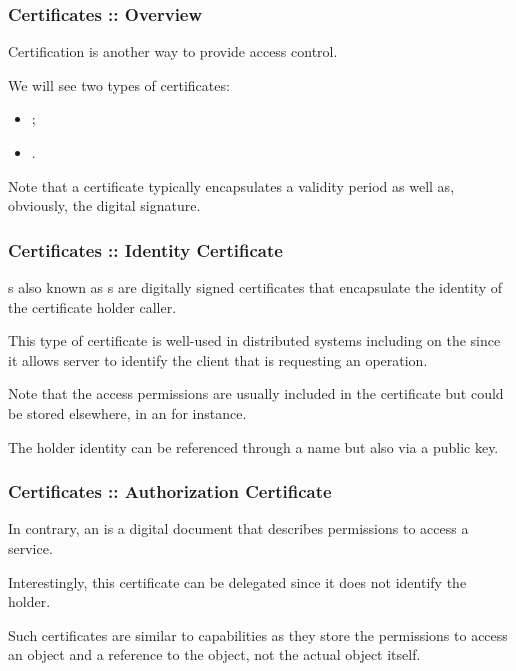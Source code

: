 
\begin{frame}
  \frametitle{Certificates :: Overview}

  Certification is another way to provide access control.

  \-

  We will see two types of certificates:

  \begin{itemize}
    \item
      ;
    \item
      .
  \end{itemize}

  \-

  Note that a certificate typically encapsulates a validity period as well
  as, obviously, the digital signature.
\end{frame}


\begin{frame}
  \frametitle{Certificates :: Identity Certificate}

  s also known as s are digitally signed certificates that encapsulate the
  identity of the certificate holder \ie{} caller.

  \-

  This type of certificate is well-used in distributed systems including
  on the  since it allows server to identify the client that
  is requesting an operation.

  \-

  Note that the access permissions are usually included in the certificate
  but could be stored elsewhere, in an  for instance.

  \-

  The holder identity can be referenced through a name but also via a
  public key.
\end{frame}


\begin{frame}
  \frametitle{Certificates :: Authorization Certificate}

  In contrary, an  is a digital document
  that describes permissions to access a service.

  \-

  Interestingly, this certificate can be delegated since it does not
  identify the holder.

  \-

  Such certificates are similar to capabilities as they store the permissions
  to access an object and a reference to the object, not the actual object
  itself.
\end{frame}

